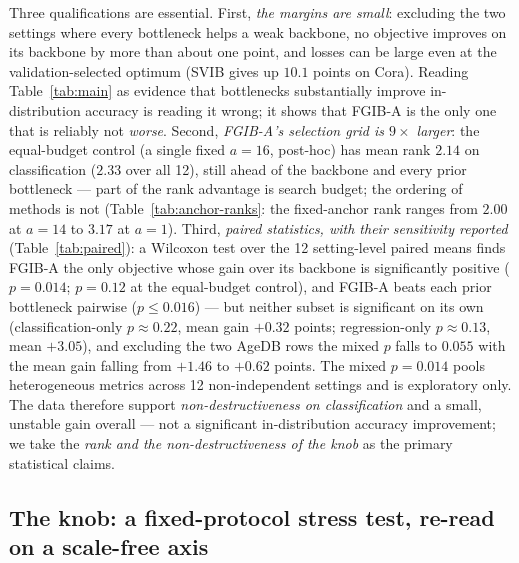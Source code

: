 \documentclass{article} %
\begin{document}
Three qualifications are essential. First, \emph{the margins are small}: excluding the
two settings where every bottleneck helps a weak backbone, no objective improves on
its backbone by more than about one point, and losses can be large even at the
validation-selected optimum (SVIB gives up $10.1$ points on Cora). Reading
Table~\ref{tab:main} as evidence that bottlenecks substantially improve
in-distribution accuracy is reading it wrong; it shows that FGIB-A is the only one that
is reliably not \emph{worse}. Second, \emph{FGIB-A's selection grid is $9\times$ larger}:
the equal-budget control (a single fixed $a=16$, post-hoc) has mean rank $2.14$ on
classification ($2.33$ over all 12), still ahead of the backbone and every prior
bottleneck --- part of the rank advantage is search budget; the ordering of methods is
not (Table~\ref{tab:anchor-ranks}: the fixed-anchor rank ranges from $2.00$ at $a=14$
to $3.17$ at $a=1$). Third, \emph{paired
statistics, with their sensitivity reported} (Table~\ref{tab:paired}): a Wilcoxon test
over the 12 setting-level paired means finds FGIB-A the only objective whose gain over
its backbone is significantly positive ($p=0.014$; $p=0.12$ at the equal-budget
control), and FGIB-A beats each prior bottleneck pairwise ($p \le 0.016$) --- but neither
subset is significant on its own (classification-only $p\approx0.22$, mean gain $+0.32$
points; regression-only $p\approx0.13$, mean $+3.05$), and excluding the two AgeDB rows
the mixed $p$ falls to $0.055$ with the mean gain falling from $+1.46$ to $+0.62$
points. The mixed $p=0.014$ pools heterogeneous metrics across 12 non-independent
settings and is exploratory only. The data therefore support \emph{non-destructiveness
on classification} and a small, unstable gain overall --- not a significant
in-distribution accuracy improvement; we take the \emph{rank and the
non-destructiveness of the knob} as the primary statistical claims.

\subsection{The knob: a fixed-protocol stress test, re-read on a scale-free axis}
\label{sec:knob}
\end{document}
